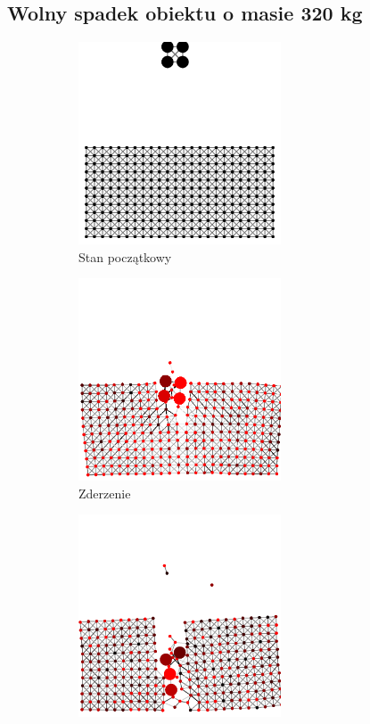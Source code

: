 \documentclass[12pt, letterpaper]{report}
\begin{document}
    \subsection{Wolny spadek obiektu o masie 320 kg}
    \begin{figure}[h]

        \begin{subfigure}{0.5\textwidth}
            \centering
            \includegraphics[width=6cm, height=6cm]{collision_2x2_24x12_mass80_1} 
            \caption{Stan początkowy}
        \end{subfigure}
        \begin{subfigure}{0.5\textwidth}
            \centering
            \includegraphics[width=6cm, height=6cm]{collision_2x2_24x12_mass80_2}
            \caption{Zderzenie}
        \end{subfigure}
        \begin{subfigure}{0.5\textwidth}
            \centering
            \includegraphics[width=6cm, height=6cm]{collision_2x2_24x12_mass80_3}

\end{subfigure}
\end{figure}
\end{document}

